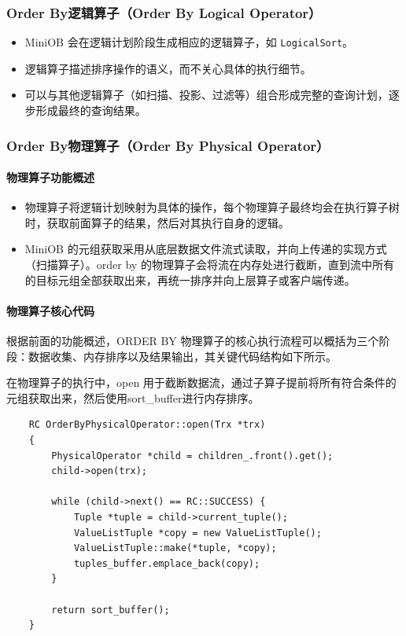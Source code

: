 \documentclass[a4paper, 12pt]{article}
\begin{document}
\subsubsection{Order By逻辑算子（Order By Logical Operator）}
\begin{itemize}
    \item MiniOB 会在逻辑计划阶段生成相应的逻辑算子，如 \texttt{LogicalSort}。
    \item 逻辑算子描述排序操作的语义，而不关心具体的执行细节。
    \item 可以与其他逻辑算子（如扫描、投影、过滤等）组合形成完整的查询计划，逐步形成最终的查询结果。
\end{itemize}

\subsubsection{Order By物理算子（Order By Physical Operator）}
\paragraph{\heiti 物理算子功能概述}
\begin{itemize}
    \item 物理算子将逻辑计划映射为具体的操作，每个物理算子最终均会在执行算子树时，获取前面算子的结果，然后对其执行自身的逻辑。
    \item MiniOB 的元组获取采用从底层数据文件流式读取，并向上传递的实现方式（扫描算子）。order by 的物理算子会将流在内存处进行截断，直到流中所有的目标元组全部获取出来，再统一排序并向上层算子或客户端传递。
\end{itemize}

\paragraph{\heiti 物理算子核心代码} 

根据前面的功能概述，ORDER BY 物理算子的核心执行流程可以概括为三个阶段：数据收集、内存排序以及结果输出，其关键代码结构如下所示。

在物理算子的执行中，open 用于截断数据流，通过子算子提前将所有符合条件的元组获取出来，然后使用sort\_buffer进行内存排序。

\begin{lstlisting}
    RC OrderByPhysicalOperator::open(Trx *trx)
    {
        PhysicalOperator *child = children_.front().get();
        child->open(trx);

        while (child->next() == RC::SUCCESS) {
            Tuple *tuple = child->current_tuple();
            ValueListTuple *copy = new ValueListTuple();
            ValueListTuple::make(*tuple, *copy);
            tuples_buffer.emplace_back(copy);
        }

        return sort_buffer();
    }
\end{lstlisting}
\end{document}
